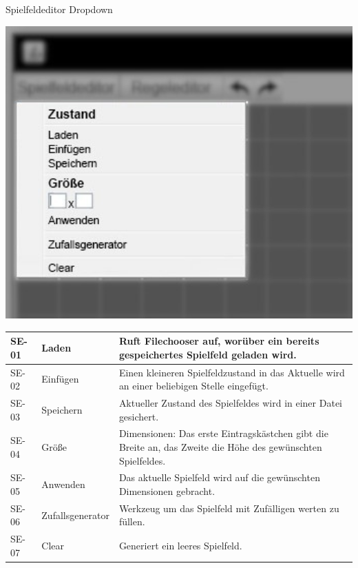 \documentclass[11pt,a4paper]{article}
\begin{document}
	
\pagebreak
\par
    Spielfeldeditor Dropdown %
    \par
    \includegraphics[width=15cm]{spielfeldeditor_dropdown_edit.jpeg} %

    \begin{longtable}[m]{|m{2cm}|m{4cm}|m{9cm}|} %
        \hline
        SE-01 & Laden & Ruft Filechooser auf, worüber ein bereits gespeichertes Spielfeld geladen wird. \\
        \hline
        SE-02 & Einfügen & Einen kleineren Spielfeldzustand in das Aktuelle wird an einer beliebigen Stelle eingefügt. \\
        \hline
        SE-03 & Speichern & Aktueller Zustand des Spielfeldes wird in einer Datei gesichert. \\
        \hline
        SE-04 & Größe & Dimensionen: Das erste Eintragskästchen gibt die Breite an, das Zweite die Höhe des gewünschten Spielfeldes.\\
        \hline
        SE-05 & Anwenden & Das aktuelle Spielfeld wird auf die gewünschten Dimensionen gebracht. \\
        \hline
        SE-06 & Zufallsgenerator & Werkzeug um das Spielfeld mit Zufälligen werten zu füllen.\\
        \hline
        SE-07 & Clear & Generiert ein leeres Spielfeld.\\
        \hline
    \end{longtable}
    
\end{document}
